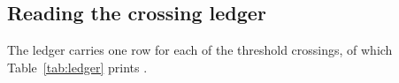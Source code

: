 \subsection{Reading the crossing ledger}
\label{sec:ledgercolumns}

The ledger carries one row for each of the \EvNCrossRaw{} threshold
crossings, of which Table~\ref{tab:ledger} prints \SiLdgSampN.

